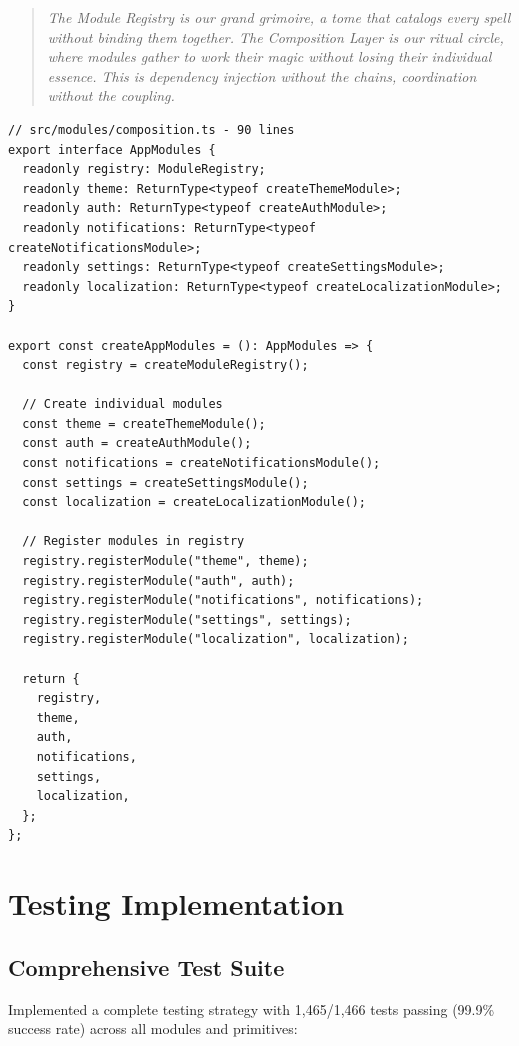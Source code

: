 \documentclass[11pt]{article}
\begin{document}
\begin{quote}
\emph{The Module Registry is our grand grimoire, a tome that catalogs every spell without binding them together. The Composition Layer is our ritual circle, where modules gather to work their magic without losing their individual essence. This is dependency injection without the chains, coordination without the coupling.}
\end{quote}

\begin{lstlisting}[style=typescript]
// src/modules/composition.ts - 90 lines
export interface AppModules {
  readonly registry: ModuleRegistry;
  readonly theme: ReturnType<typeof createThemeModule>;
  readonly auth: ReturnType<typeof createAuthModule>;
  readonly notifications: ReturnType<typeof createNotificationsModule>;
  readonly settings: ReturnType<typeof createSettingsModule>;
  readonly localization: ReturnType<typeof createLocalizationModule>;
}

export const createAppModules = (): AppModules => {
  const registry = createModuleRegistry();
  
  // Create individual modules
  const theme = createThemeModule();
  const auth = createAuthModule();
  const notifications = createNotificationsModule();
  const settings = createSettingsModule();
  const localization = createLocalizationModule();

  // Register modules in registry
  registry.registerModule("theme", theme);
  registry.registerModule("auth", auth);
  registry.registerModule("notifications", notifications);
  registry.registerModule("settings", settings);
  registry.registerModule("localization", localization);

  return {
    registry,
    theme,
    auth,
    notifications,
    settings,
    localization,
  };
};
\end{lstlisting}

\section{Testing Implementation}

\subsection{Comprehensive Test Suite}

Implemented a complete testing strategy with 1,465/1,466 tests passing (99.9\% success rate) across all modules and primitives:
\end{document}
